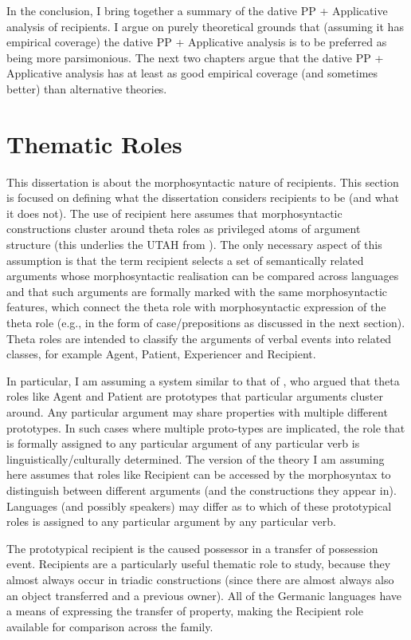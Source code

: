 In the conclusion, I bring together a summary of the dative PP + Applicative analysis of recipients. I argue on purely theoretical grounds that (assuming it has empirical coverage) the dative PP + Applicative analysis is to be preferred as being more parsimonious. The next two chapters argue that the dative PP + Applicative analysis has at least as good empirical coverage (and sometimes better) than alternative theories.

\section{Thematic Roles}
This dissertation is about the morphosyntactic nature of recipients. This section is focused on defining what the dissertation considers recipients to be (and what it does not). The use of recipient here assumes that morphosyntactic constructions cluster around theta roles as privileged atoms of argument structure (this underlies the UTAH from \citealt{Baker.1988}). The only necessary aspect of this assumption is that the term recipient selects a set of semantically related arguments whose morphosyntactic realisation can be compared across languages and that such arguments are formally marked with the same morphosyntactic features, which connect the theta role with morphosyntactic expression of the theta role (e.g., in the form of case/prepositions as discussed in the next section). Theta roles are intended to classify the arguments of verbal events into related classes, for example Agent, Patient, Experiencer and Recipient. 

In particular, I am assuming a system similar to that of \cite{Dowty.1991}, who argued that theta roles like Agent and Patient are prototypes that particular arguments cluster around. Any particular argument may share properties with multiple different prototypes. In such cases where multiple proto-types are implicated, the role that is formally assigned to any particular argument of any particular verb is linguistically/culturally determined. The version of the theory I am assuming here assumes that roles like Recipient can be accessed by the morphosyntax to distinguish between different arguments (and the constructions they appear in). Languages (and possibly speakers) may differ as to which of these prototypical roles is assigned to any particular argument by any particular verb.

The prototypical recipient is the caused possessor in a transfer of possession event. Recipients are a particularly useful thematic role to study, because they almost always occur in triadic constructions (since there are almost always also an object transferred and a previous owner). All of the Germanic languages have a means of expressing the transfer of property, making the Recipient role available for comparison across the family. 

